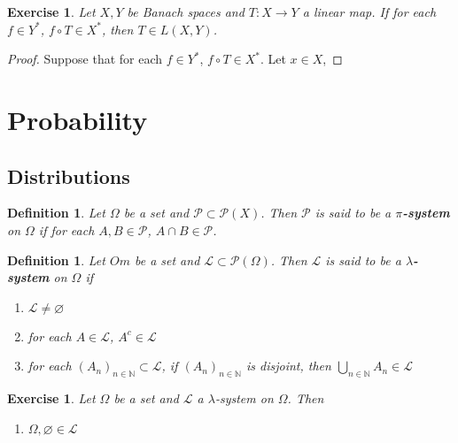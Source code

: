 \documentclass[12pt]{amsart}
\newtheorem{defn}[thm]{Definition}
\newtheorem{ex}[thm]{Exercise}
\newcommand{\lam}{\lambda}
\newcommand{\Om}{\Omega}
\newcommand{\N}{\mathbb{N}}
\newcommand{\ML}{\mathcal{L}}
\newcommand{\MP}{\mathcal{P}}
\begin{document}
\begin{ex}
Let $X, Y$ be Banach spaces and $T:X \rightarrow Y$ a linear map. If for each $f \in Y^*$, $f \circ T \in X^*$, then $T \in L(X,Y)$. 
\end{ex}

\begin{proof}
Suppose that for each $f \in Y^*$, $f \circ T \in X^*$. Let $x \in X$, 
\end{proof}




























\newpage

\section{Probability}
\subsection{Distributions}

\begin{defn}
Let $\Om$ be a set and $\MP \subset \MP(X)$. Then $\MP$ is said to be a \textbf{$\pi$-system} on $\Om$ if for each $A,B \in \MP$, $A \cap B \in \MP$.
\end{defn}

\begin{defn}
Let $Om$ be a set and $\ML \subset \MP(\Om)$. Then $\ML$ is said to be a \textbf{$\lam$-system} on $\Om$ if 
\begin{enumerate}
\item $\ML \neq \varnothing$
\item for each $A \in \ML$, $A^c \in \ML$
\item for each $(A_n)_{n \in \N} \subset \ML$, if $(A_n)_{n \in \N}$ is disjoint, then $\bigcup\limits_{n \in \N}A_n \in \ML$
\end{enumerate}
\end{defn}

\begin{ex}
Let $\Om$ be a set and $\ML$ a $\lam$-system on $\Om$. Then 
\begin{enumerate}
\item $\Om, \varnothing \in \ML$
\end{enumerate} 
\end{ex}
\end{document}
